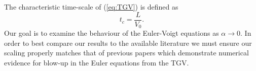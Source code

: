 The characteristic time-scale of (\ref{eq:TGV}) is defined as
\begin{equation}\label{eq:TGV:tc}
t_c = \frac{L}{V_0}.
\end{equation}
Our goal is to examine the behaviour of the Euler-Voigt equations as $\alpha\rightarrow 0$. In order to best compare our results to the available literature we must ensure our scaling properly matches that of previous papers which demonstrate numerical evidence for blow-up in the Euler equations from the TGV.